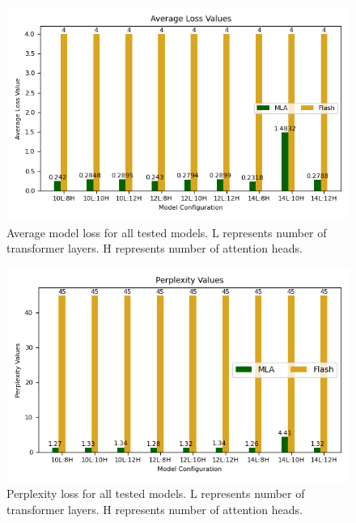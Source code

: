 \begin{figure}[H]
    \centering
    \includegraphics[width=\linewidth]{sections/images/avg_loss.png}
    \caption{Average model loss for all tested models. L represents number of transformer layers. H represents number of attention heads.}
    \label{avg_loss}
\end{figure}

\begin{figure}[H]
    \centering
    \includegraphics[width=\linewidth]{sections/images/perplexity.png}
    \caption{Perplexity loss for all tested models. L represents number of transformer layers. H represents number of attention heads.}
    \label{perplexity}
\end{figure}